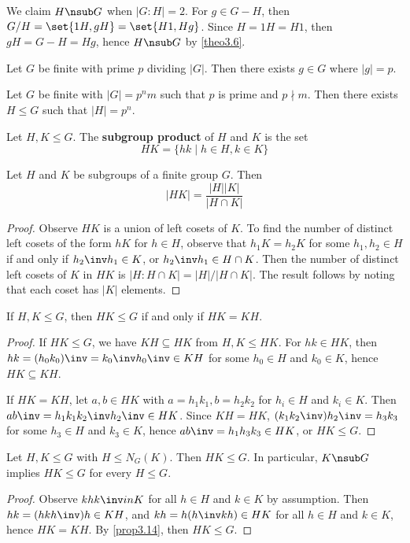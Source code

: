 \note We claim $H \nsub G$ when $|G : H| = 2$. For $g \in G - H$, then $G/H = \set{1H, gH} = \set{H1, Hg}$. Since $H = 1H = H1$, then $gH = G - H = Hg$, hence $H \nsub G$ by \autoref{theo3.6}.

 \label{theo3.11}
Let $G$ be finite with prime $p$ dividing $|G|$. Then there exists $g \in G$ where $|g| = p$.

\theo[Sylow] \label{theo3.12}
Let $G$ be finite with $|G| = p^nm$ such that $p$ is prime and $p \nmid m$. Then there exists $H \leq G$ such that $|H| = p^n$.

 Let $H, K \leq G$. The \textbf{subgroup product} of $H$ and $K$ is the set
\[HK = \{hk \mid h \in H, k \in K\}\]

 \label{prop3.13}
Let $H$ and $K$ be subgroups of a finite group $G$. Then
\[|HK| = \frac{|H||K|}{|H \cap K|}\]
\begin{proof}
    Observe $HK$ is a union of left cosets of $K$. To find the number of distinct left cosets of the form $hK$ for $h \in H$, observe that $h_1K = h_2K$ for some $h_1, h_2 \in H$ if and only if $h_2\inv h_1 \in K$, or $h_2\inv h_1 \in H \cap K$. Then the number of distinct left cosets of $K$ in $HK$ is $|H : H \cap K| = |H|/|H \cap K|$. The result follows by noting that each coset has $|K|$ elements.
\end{proof}

 \label{prop3.14}
If $H, K \leq G$, then $HK \leq G$ if and only if $HK = KH$.
\begin{proof}
    If $HK \leq G$, we have $KH \subseteq HK$ from $H, K \leq HK$. For $hk \in HK$, then $hk = (h_0k_0)\inv = k_0\inv h_0\inv \in KH$ for some $h_0 \in H$ and $k_0 \in K$, hence $HK \subseteq KH$.

    If $HK = KH$, let $a, b \in HK$ with $a = h_1k_1, b = h_2k_2$ for $h_i \in H$ and $k_i \in K$. Then $ab\inv = h_1k_1k_2\inv h_2\inv \in HK$. Since $KH = HK$, $(k_1k_2\inv) h_2\inv = h_3k_3$ for some $h_3 \in H$ and $k_3 \in K$, hence $ab\inv = h_1h_3k_3 \in HK$, or $HK \leq G$.
\end{proof}

 \label{cor3.15}
Let $H, K \leq G$ with $H \leq N_G(K)$. Then $HK \leq G$. In particular, $K \nsub G$ implies $HK \leq G$ for every $H \leq G$.

\begin{proof}
    Observe $khk\inv in K$ for all $h \in H$ and $k \in K$ by assumption. Then $hk = (hkh\inv)h \in KH$, and $kh = h(h\inv kh) \in HK$ for all $h \in H$ and $k \in K$, hence $HK = KH$. By \autoref{prop3.14}, then $HK \leq G$.
\end{proof}

